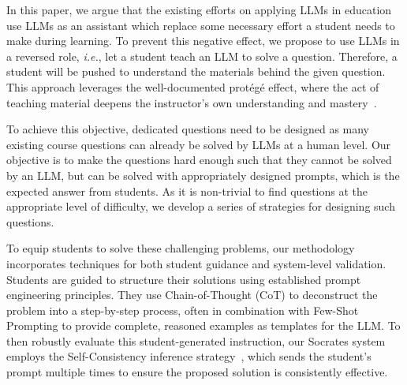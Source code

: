 \documentclass{article} %
\begin{document}
In this paper, we argue that the existing efforts on applying LLMs in education
use LLMs as an assistant which replace some necessary effort a student needs to
make during learning. To prevent this negative effect, we propose to use
LLMs in a reversed role, {\em i.e.}, let a student teach an LLM to solve a
question. Therefore, a student will be pushed to understand
the materials behind the given question.  This approach leverages the well-documented prot\'eg\'e effect, where the act of teaching material deepens the instructor's own understanding and mastery~\citep{roscoe2007understanding, chase2009teachable}.

To achieve this objective, dedicated questions need to be designed as many
existing course questions can already be solved by LLMs at a human level. Our
objective is to make the questions hard enough such that they cannot be solved by an LLM, but can be solved with appropriately designed prompts, which is the
expected answer from students. As it is non-trivial to find questions at the
appropriate level of difficulty, we develop a series of strategies for designing such questions.

To equip students to solve these challenging problems, our methodology incorporates techniques for both student guidance and system-level validation. Students are guided to structure their solutions using established prompt engineering principles. They use Chain-of-Thought (CoT) \citep{wei2022chain,kojima2022large} to deconstruct the problem into a step-by-step process, often in combination with Few-Shot Prompting \citep{Brown2020LanguageMA} to provide complete, reasoned examples as templates for the LLM. To then robustly evaluate this student-generated instruction, our \textsf{Socrates} system employs the Self-Consistency inference strategy~\citep{wang2022self,min2023beyond}, which sends the student's prompt multiple times to ensure the proposed solution is consistently effective.
\end{document}
